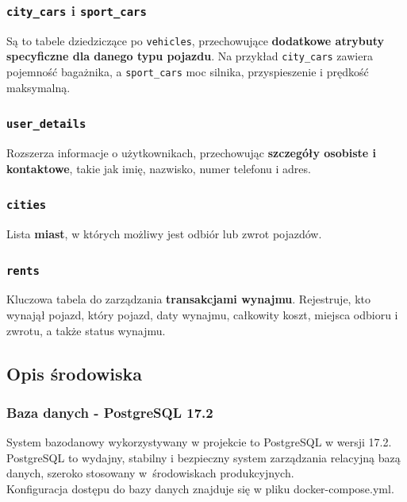 \documentclass[12pt]{article}
\begin{document}
	\subsubsection{\texttt{city\_cars} i \texttt{sport\_cars}}
	Są to tabele dziedziczące po \texttt{vehicles}, przechowujące \textbf{dodatkowe atrybuty specyficzne dla danego typu pojazdu}. Na przykład \texttt{city\_cars} zawiera pojemność bagażnika, a \texttt{sport\_cars} moc silnika, przyspieszenie i prędkość maksymalną.
	
	\subsubsection{\texttt{user\_details}}
	Rozszerza informacje o użytkownikach, przechowując \textbf{szczegóły osobiste i kontaktowe}, takie jak imię, nazwisko, numer telefonu i adres.
	
	\subsubsection{\texttt{cities}}
	Lista \textbf{miast}, w których możliwy jest odbiór lub zwrot pojazdów.
	
	\subsubsection{\texttt{rents}}
	Kluczowa tabela do zarządzania \textbf{transakcjami wynajmu}. Rejestruje, kto wynajął pojazd, który pojazd, daty wynajmu, całkowity koszt, miejsca odbioru i zwrotu, a także status wynajmu.
	
	\subsection{Opis środowiska}
	\subsubsection{Baza danych - PostgreSQL 17.2}
	System bazodanowy wykorzystywany w projekcie to PostgreSQL w wersji 17.2. PostgreSQL to wydajny, stabilny i bezpieczny system zarządzania relacyjną bazą danych, szeroko stosowany w~środowiskach produkcyjnych. \\
	Konfiguracja dostępu do bazy danych znajduje się w pliku docker-compose.yml.
	
\end{document}
